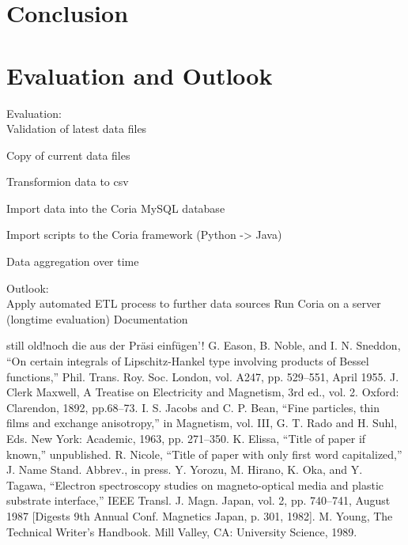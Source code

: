 \documentclass[conference]{IEEEtran}
\begin{document}
\section{Conclusion} %
\section{Evaluation and Outlook}

Evaluation: \\
Validation of latest data files

Copy of current data files

Transformion data to csv

Import data into the Coria MySQL database

Import scripts to the Coria framework (Python -> Java)

Data aggregation over time

Outlook:\\
Apply automated ETL process to further data sources
Run Coria on a server (longtime evaluation)
Documentation








\begin{thebibliography}{00}


still old!noch die aus der Präsi einfügen'! G. Eason, B. Noble, and I. N. Sneddon, ``On certain integrals of Lipschitz-Hankel type involving products of Bessel functions,'' Phil. Trans. Roy. Soc. London, vol. A247, pp. 529--551, April 1955.
 J. Clerk Maxwell, A Treatise on Electricity and Magnetism, 3rd ed., vol. 2. Oxford: Clarendon, 1892, pp.68--73.
 I. S. Jacobs and C. P. Bean, ``Fine particles, thin films and exchange anisotropy,'' in Magnetism, vol. III, G. T. Rado and H. Suhl, Eds. New York: Academic, 1963, pp. 271--350.
 K. Elissa, ``Title of paper if known,'' unpublished.
 R. Nicole, ``Title of paper with only first word capitalized,'' J. Name Stand. Abbrev., in press.
 Y. Yorozu, M. Hirano, K. Oka, and Y. Tagawa, ``Electron spectroscopy studies on magneto-optical media and plastic substrate interface,'' IEEE Transl. J. Magn. Japan, vol. 2, pp. 740--741, August 1987 [Digests 9th Annual Conf. Magnetics Japan, p. 301, 1982].
 M. Young, The Technical Writer's Handbook. Mill Valley, CA: University Science, 1989.
\end{thebibliography}
\end{document}

